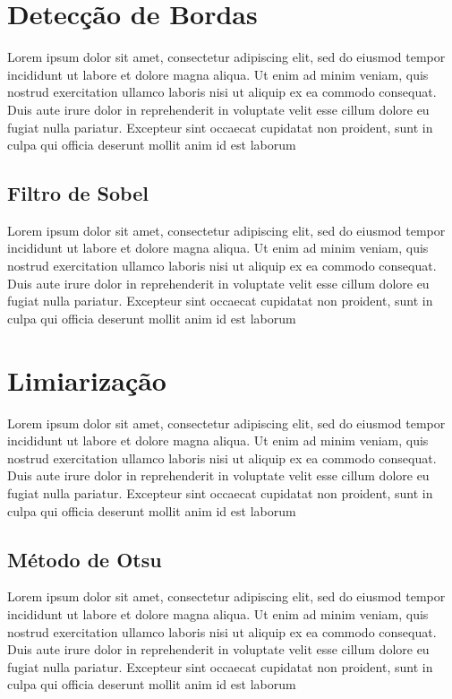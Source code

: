 \section{Detecção de Bordas}
\label{sec:detecbordas}

Lorem ipsum dolor sit amet, consectetur adipiscing elit, sed do eiusmod tempor incididunt ut labore et dolore magna aliqua. Ut enim ad minim veniam, quis nostrud exercitation ullamco laboris nisi ut aliquip ex ea commodo consequat. Duis aute irure dolor in reprehenderit in voluptate velit esse cillum dolore eu fugiat nulla pariatur. Excepteur sint occaecat cupidatat non proident, sunt in culpa qui officia deserunt mollit anim id est laborum

\subsection{Filtro de Sobel}
\label{sec:sobel}

Lorem ipsum dolor sit amet, consectetur adipiscing elit, sed do eiusmod tempor incididunt ut labore et dolore magna aliqua. Ut enim ad minim veniam, quis nostrud exercitation ullamco laboris nisi ut aliquip ex ea commodo consequat. Duis aute irure dolor in reprehenderit in voluptate velit esse cillum dolore eu fugiat nulla pariatur. Excepteur sint occaecat cupidatat non proident, sunt in culpa qui officia deserunt mollit anim id est laborum

\section{Limiarização}
\label{sec:limiarizacao}

Lorem ipsum dolor sit amet, consectetur adipiscing elit, sed do eiusmod tempor incididunt ut labore et dolore magna aliqua. Ut enim ad minim veniam, quis nostrud exercitation ullamco laboris nisi ut aliquip ex ea commodo consequat. Duis aute irure dolor in reprehenderit in voluptate velit esse cillum dolore eu fugiat nulla pariatur. Excepteur sint occaecat cupidatat non proident, sunt in culpa qui officia deserunt mollit anim id est laborum

\subsection{Método de Otsu}
\label{sec:otsu}

Lorem ipsum dolor sit amet, consectetur adipiscing elit, sed do eiusmod tempor incididunt ut labore et dolore magna aliqua. Ut enim ad minim veniam, quis nostrud exercitation ullamco laboris nisi ut aliquip ex ea commodo consequat. Duis aute irure dolor in reprehenderit in voluptate velit esse cillum dolore eu fugiat nulla pariatur. Excepteur sint occaecat cupidatat non proident, sunt in culpa qui officia deserunt mollit anim id est laborum

